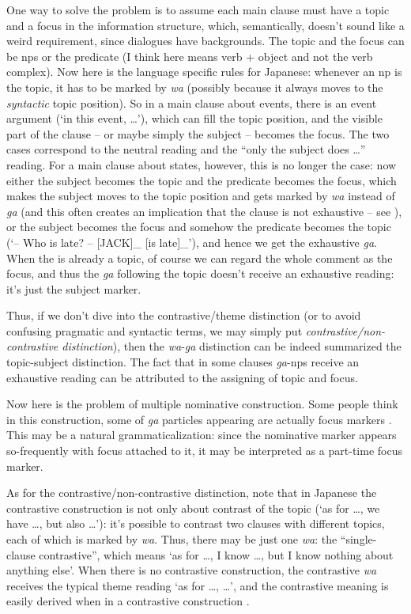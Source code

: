 \documentclass[UTF8, a4paper, oneside, scheme=plain]{ctexart}
\newcommand*{\citesec}[1]{\S~{#1}}
\newcommand*{\term}[1]{\emph{#1}}
\newcommand{\corpus}[1]{\emph{#1}}
\newcommand{\translate}[1]{`#1'}
\begin{document}
One way to solve the problem is to assume each main clause must have a topic and a focus
in the information structure,
which, semantically, doesn't sound like a weird requirement,
since dialogues have backgrounds.
The topic and the focus can be \ac{np}s or the predicate 
(I think here \citet{heycock2008} means verb + object and not the verb complex).
Now here is the language specific rules for Japanese:
whenever an \ac{np} is the topic, it has to be marked by \corpus{wa} 
(possibly because it always moves to the \emph{syntactic} topic position).
So in a main clause about events,
there is an event argument (\translate{in this event, \dots}),
which can fill the topic position, 
and the visible part of the clause -- or maybe simply the subject -- becomes the focus.
The two cases correspond to 
the neutral reading and the ``only the subject does \dots'' reading.
For a main clause about states, however,
this is no longer the case:
now either the subject becomes the topic and the predicate becomes the focus,
which makes the subject moves to the topic position and gets marked by \corpus{wa} instead of \corpus{ga}
(and this often creates an implication that the clause is not exhaustive -- 
see \citet[(2)]{heycock2008}),
or the subject becomes the focus and somehow the predicate becomes the topic 
(\translate{-- Who is late? -- [JACK]_{} [is late]_{\text{old information}}}),
and hence we get the exhaustive \corpus{ga}.
When the is already a topic, of course we can regard the whole comment as the focus,
and thus the \corpus{ga} following the topic doesn't receive an exhaustive reading:
it's just the subject marker.

Thus, if we don't dive into the contrastive/theme distinction
(or to avoid confusing pragmatic and syntactic terms,
we may simply put \term{contrastive/non-contrastive distinction}),
then the \corpus{wa}-\corpus{ga} distinction can be indeed summarized the topic-subject distinction.
The fact that in some clauses \corpus{ga}-\ac{np}s receive an exhaustive reading 
can be attributed to the assigning of topic and focus.

Now here is the problem of multiple nominative construction.
Some people think in this construction, 
some of \corpus{ga} particles appearing are actually focus markers 
\citep{vermeulen2002ga,vermeulen2005two}.
This may be a natural grammaticalization:
since the nominative marker appears so-frequently with focus attached to it,
it may be interpreted as a part-time focus marker.

As for the contrastive/non-contrastive distinction,
note that in Japanese the contrastive construction is not only about contrast of the topic 
(\translate{as for \dots, we have \dots, but also \dots}):
it's possible to contrast two clauses with different topics,
each of which is marked by \corpus{wa}.
Thus, there may be just one \corpus{wa}:
the ``single-clause contrastive'',
which means \translate{as for \dots, I know \dots, but I know nothing about anything else}.
When there is no contrastive construction,
the contrastive \corpus{wa} receives the typical theme reading 
\translate{as for \dots, \dots},
and the contrastive meaning is easily derived when in a contrastive construction
\citep[\citesec{3.4.2}]{heycock2008}.
\end{document}
